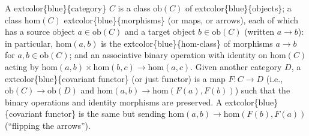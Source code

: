 \documentclass[
]{book}
\begin{document}
A extcolor\{blue\}\{category\} \(C\) is a class \(\text{ob}(C)\) of extcolor\{blue\}\{objects\}; a class \(\text{hom}(C)\) extcolor\{blue\}\{morphisms\} (or maps, or arrows), each of which has a source object \(a \in \text{ob}(C)\) and a target object \(b \in \text{ob}(C)\) (written \(a \to b\)): in particular, \(\text{hom}(a,b)\) is the extcolor\{blue\}\{hom-class\} of morphisms \(a \to b\) for \(a,b \in \text{ob}(C)\); and an associative binary operation with identity on \(\text{hom}(C)\) acting by \(\text{hom}(a,b) \times \text{hom}(b,c) \to \text{hom}(a,c)\).
Given another category \(D\), a extcolor\{blue\}\{covariant functor\} (or just functor) is a map \(F : C \to D\) (i.e., \(\text{ob}(C) \to \text{ob}(D)\) and \(\text{hom}(a,b) \to \text{hom}(F(a), F(b))\)) such that the binary operations and identity morphisms are preserved. A extcolor\{blue\}\{covariant functor\} is the same but sending \(\text{hom}(a,b) \to \text{hom}(F(b), F(a))\) (``flipping the arrows'').

  
\end{document}
